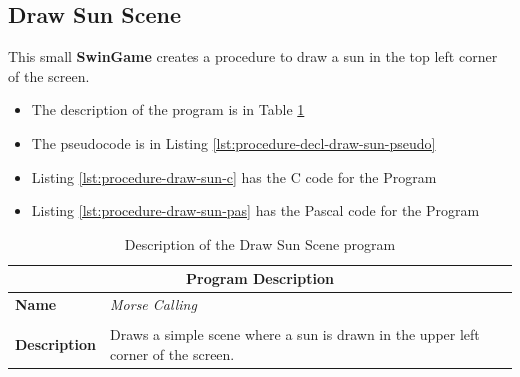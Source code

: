 

\clearpage
\subsection{Draw Sun Scene} %
\label{sub:draw_sun}

This small \textbf{SwinGame} creates a procedure to draw a sun in the top left corner of the screen.
\begin{itemize}
  \item The description of the program is in Table \ref{tbl:procedure-decl-draw-sun}
  \item The pseudocode is in Listing \ref{lst:procedure-decl-draw-sun-pseudo}
  \item Listing \ref{lst:procedure-draw-sun-c} has the C code for the Program
  \item Listing \ref{lst:procedure-draw-sun-pas} has the Pascal code for the Program
\end{itemize}

\begin{table}[h]
\centering
\begin{tabular}{l|p{10cm}}
  \hline
  \multicolumn{2}{c}{\textbf{Program Description}} \\
  \hline
  \textbf{Name} & \emph{Morse Calling} \\
  \\
  \textbf{Description} & Draws a simple scene where a sun is drawn in the upper left corner of the screen. \\
  \hline
\end{tabular}
\caption{Description of the Draw Sun Scene program}
\label{tbl:procedure-decl-draw-sun}
\end{table}

